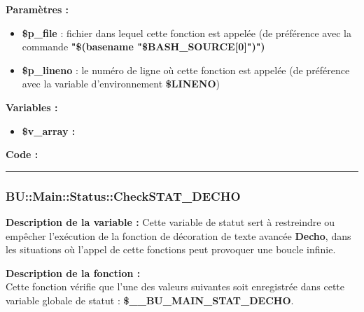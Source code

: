 \documentclass[a4paper,10pt]{article}
\begin{document}
\begin{justify}
    \textbf{Paramètres :}

    \begin{itemize}
        \item \color{orange}\textbf{\$p\_file}\color{white} : fichier dans lequel cette fonction est appelée (de préférence avec la commande \textbf{\textbf{"\$(\color{gray}basename \color{white}"\color{orange}\$BASH\_SOURCE[0]\color{white}")")}}\\

        \item \color{orange}\textbf{\$p\_lineno}\color{white} : le numéro de ligne où cette fonction est appelée (de préférence avec la variable d'environnement \textbf{\color{orange}\$LINENO})
    \end{itemize}
\end{justify}

\begin{justify}
    \textbf{Variables :}

    \begin{itemize}
        \item \textbf{\color{orange}\$v\_array\color{white} :} \\
    \end{itemize}
\end{justify}

\textbf{Code :}



\color{blue}\par\noindent\rule{\textwidth}{0.4pt}\color{white}

\color{blue}
\subsubsection{\color{mauve}BU::Main::Status::CheckSTAT\_DECHO}\color{white}

\begin{justify}
    \textbf{Description de la variable :}
    Cette variable de statut sert à restreindre ou empêcher l'exécution de la fonction de décoration de texte avancée \textbf{\color{mauve}Decho}, dans les situations où l'appel de cette fonctions peut provoquer une boucle infinie.
\end{justify}

\begin{justify}
    \textbf{Description de la fonction :}\\
    Cette fonction vérifie que l'une des valeurs suivantes soit enregistrée dans cette variable globale de statut : \textbf{\color{orange}\$\_\_BU\_MAIN\_STAT\_DECHO}.
\end{justify}
\end{document}
